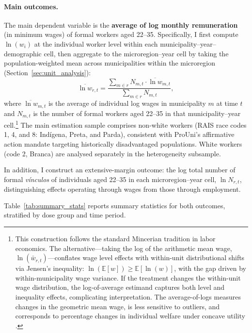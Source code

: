\paragraph{Main outcomes.}
The main dependent variable is the \textbf{average of log monthly remuneration} (in minimum wages) of formal workers aged 22--35. Specifically, I first compute $\ln(w_i)$ at the individual worker level within each municipality--year--demographic cell, then aggregate to the microregion--year cell by taking the population-weighted mean across municipalities within the microregion (Section~\ref{sec:unit_analysis}):
\begin{equation}
    \overline{\ln w}_{r,t} = \frac{\sum_{m \in r} N_{m,t} \cdot \overline{\ln w}_{m,t}}{\sum_{m \in r} N_{m,t}},
    \label{eq:outcome_variable}
\end{equation}
where $\overline{\ln w}_{m,t}$ is the average of individual log wages in municipality $m$ at time $t$ and $N_{m,t}$ is the number of formal workers aged 22--35 in that municipality--year cell.\footnote{This construction follows the standard Mincerian tradition in labor economics. The alternative---taking the log of the arithmetic mean wage, $\ln(\bar{w}_{r,t})$---conflates wage level effects with within-unit distributional shifts via Jensen's inequality: $\ln(\mathbb{E}[w]) \geq \mathbb{E}[\ln(w)]$, with the gap driven by within-municipality wage variance. If the treatment changes the within-unit wage distribution, the log-of-average estimand captures both level and inequality effects, complicating interpretation. The average-of-logs measures changes in the geometric mean wage, is less sensitive to outliers, and corresponds to percentage changes in individual welfare under concave utility \cite{Card1999}.} The main estimation sample comprises non-white workers (RAIS race codes 1, 4, and 8: Ind\'{i}gena, Preta, and Parda), consistent with ProUni's affirmative action mandate targeting historically disadvantaged populations. White workers (code 2, Branca) are analysed separately in the heterogeneity subsample.

In addition, I construct an extensive-margin outcome: the log total number of formal \emph{v\'inculos} of individuals aged 22--35 in each microregion--year cell, $\ln N_{r,t}$, distinguishing effects operating through wages from those through employment.

Table~\ref{tab:summary_stats} reports summary statistics for both outcomes, stratified by dose group and time period.

